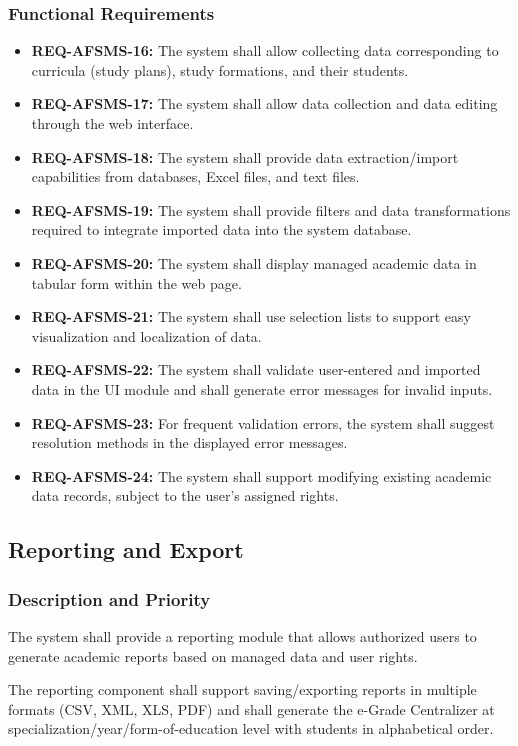 \documentclass[11pt, a4paper]{article}
\begin{document}
\subsubsection{Functional Requirements}
\begin{itemize}
    \item \textbf{REQ-AFSMS-16:} The system shall allow collecting data corresponding to curricula (study plans), study formations, and their students.
    \item \textbf{REQ-AFSMS-17:} The system shall allow data collection and data editing through the web interface.
    \item \textbf{REQ-AFSMS-18:} The system shall provide data extraction/import capabilities from databases, Excel files, and text files.
    \item \textbf{REQ-AFSMS-19:} The system shall provide filters and data transformations required to integrate imported data into the system database.
    \item \textbf{REQ-AFSMS-20:} The system shall display managed academic data in tabular form within the web page.
    \item \textbf{REQ-AFSMS-21:} The system shall use selection lists to support easy visualization and localization of data.
    \item \textbf{REQ-AFSMS-22:} The system shall validate user-entered and imported data in the UI module and shall generate error messages for invalid inputs.
    \item \textbf{REQ-AFSMS-23:} For frequent validation errors, the system shall suggest resolution methods in the displayed error messages.
    \item \textbf{REQ-AFSMS-24:} The system shall support modifying existing academic data records, subject to the user's assigned rights.
\end{itemize}

\subsection{Reporting and Export}
\subsubsection{Description and Priority}
The system shall provide a reporting module that allows authorized users to generate academic reports based on managed data and user rights.

The reporting component shall support saving/exporting reports in multiple formats (CSV, XML, XLS, PDF) and shall generate the e-Grade Centralizer at specialization/year/form-of-education level with students in alphabetical order.
\end{document}
